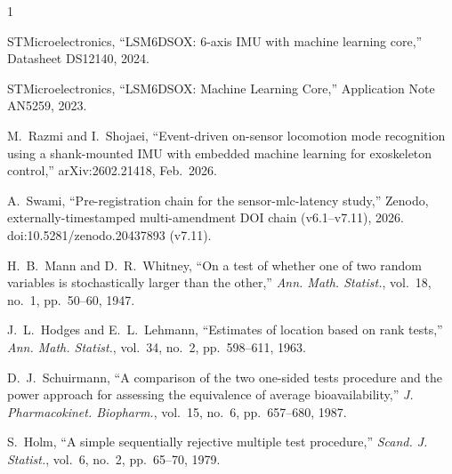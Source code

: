 \documentclass{IEEE_lsens}
\begin{document}
\begin{thebibliography}{1}

 STMicroelectronics, ``LSM6DSOX: 6-axis IMU with machine learning core,'' Datasheet DS12140, 2024.

 STMicroelectronics, ``LSM6DSOX: Machine Learning Core,'' Application Note AN5259, 2023.

 M.~Razmi and I.~Shojaei, ``Event-driven on-sensor locomotion mode recognition using a shank-mounted IMU with embedded machine learning for exoskeleton control,'' arXiv:2602.21418, Feb.\ 2026.

 A.~Swami, ``Pre-registration chain for the sensor-mlc-latency study,'' Zenodo, externally-timestamped multi-amendment DOI chain (v6.1--v7.11), 2026. doi:10.5281/zenodo.20437893 (v7.11).

 H.~B.~Mann and D.~R.~Whitney, ``On a test of whether one of two random variables is stochastically larger than the other,'' \emph{Ann. Math. Statist.}, vol.~18, no.~1, pp.~50--60, 1947.

 J.~L.~Hodges and E.~L.~Lehmann, ``Estimates of location based on rank tests,'' \emph{Ann. Math. Statist.}, vol.~34, no.~2, pp.~598--611, 1963.

 D.~J.~Schuirmann, ``A comparison of the two one-sided tests procedure and the power approach for assessing the equivalence of average bioavailability,'' \emph{J. Pharmacokinet. Biopharm.}, vol.~15, no.~6, pp.~657--680, 1987.

 S.~Holm, ``A simple sequentially rejective multiple test procedure,'' \emph{Scand. J. Statist.}, vol.~6, no.~2, pp.~65--70, 1979.

\end{thebibliography}
\end{document}
